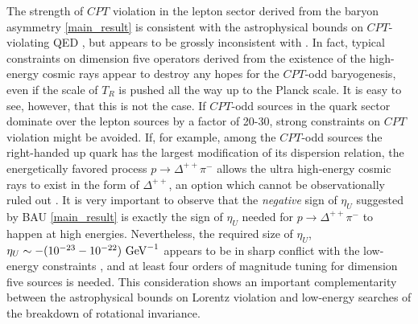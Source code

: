 \documentclass[12pt]{revtex4}
\newcommand{\GeV}{{\rm GeV}}
\begin{document}
The strength of $CPT$ violation in the lepton sector 
derived from the baryon asymmetry \eqref{main_result} is consistent with the astrophysical bounds on 
$CPT$-violating QED \cite{Jacobson:2005bg}, but appears to be grossly inconsistent with \cite{Gagnon:2004xh}.
In fact, typical constraints on dimension five operators \cite{Gagnon:2004xh} derived from the existence of 
the high-energy cosmic rays appear to destroy any hopes for the $CPT$-odd baryogenesis, even if the 
scale of $T_R$ is pushed all the way up to the Planck scale.  It is easy to see, however, that this is 
not the case. If  $CPT$-odd sources in the quark sector dominate over the lepton sources by a factor of 
20-30, strong constraints on $CPT$ violation might be avoided. If, for example, among the 
$CPT$-odd sources the right-handed up quark has the largest modification of its dispersion relation, 
the energetically favored process $p\to \Delta^{++}\pi^-$ allows the ultra high-energy cosmic rays to exist in the 
form of $\Delta^{++}$, an option which cannot be observationally ruled out \cite{Gagnon:2004xh}. 
It is very important to observe that 
the {\em negative} sign of $\eta_U$ suggested by BAU \eqref{main_result} is exactly the sign of $\eta_U$ 
needed for $p\to \Delta^{++}\pi^-$ to happen at high energies.  
Nevertheless, the required size of $\eta_U$, $\eta_U \sim - (10^{-23}-10^{-22})~\GeV^{-1}$
appears to be in sharp conflict with the low-energy constraints \cite{Sudarsky:2002ue,MP:}, and at least 
four orders of magnitude tuning for dimension five sources is needed. 
This consideration shows an important complementarity between the
astrophysical bounds on Lorentz violation and low-energy searches of the breakdown of rotational 
invariance. 
\end{document}
